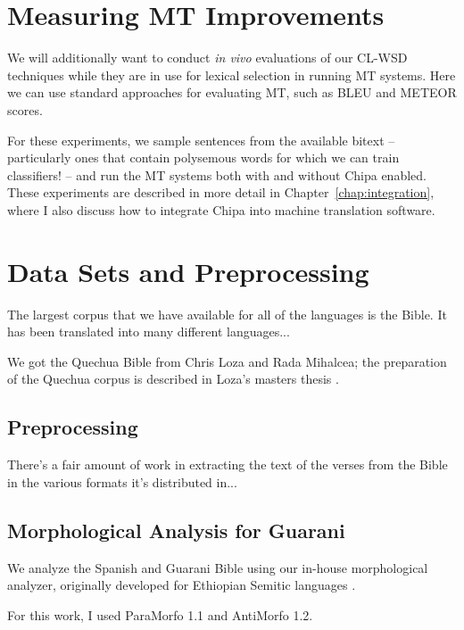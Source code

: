\section{Measuring MT Improvements}
We will additionally want to conduct \emph{in vivo} evaluations of our CL-WSD
techniques while they are in use for lexical selection in running MT systems.
Here we can use standard approaches for evaluating MT, such as BLEU and METEOR
scores.

For these experiments, we sample sentences from the available bitext --
particularly ones that contain polysemous words for which we can train
classifiers! -- and run the MT systems both with and without Chipa enabled.
These experiments are described in more detail in
Chapter~\ref{chap:integration}, where I also discuss how to integrate Chipa
into machine translation software.

\section{Data Sets and Preprocessing}
The largest corpus that we have available for all of the languages is the
Bible. It has been translated into many different languages...

We got the Quechua Bible from Chris Loza and Rada Mihalcea; the preparation
of the Quechua corpus is described in Loza's masters thesis \cite{chrisloza}.

\subsection{Preprocessing}

There's a fair amount of work in extracting the text of the verses from the
Bible in the various formats it's distributed in...



\subsection{Morphological Analysis for Guarani}
\label{sec:guaranima}
We analyze the Spanish and Guarani Bible using our in-house morphological
analyzer, originally developed for Ethiopian Semitic languages 
\cite{gasser:eacl09}.

For this work, I used ParaMorfo 1.1 and AntiMorfo 1.2.

